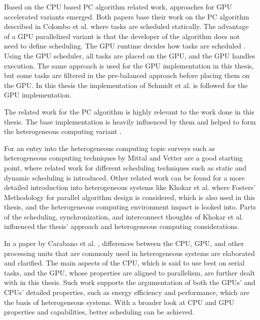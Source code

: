 Based on the CPU based PC algorithm related work, approaches for GPU accelerated variants \cite{schmidtOrderIndependentConstraintBasedCausal2018,zarebavaniCuPCCUDAbasedParallel2018} emerged. Both papers base their work on the PC algorithm described in Colombo et al. \cite{colomboOrderIndependentConstraintBasedCausal2014} where tasks are scheduled statically. The advantage of a GPU parallelized variant is that the developer of the algorithm does not need to define scheduling. The GPU runtime decides how tasks are scheduled \cite{olmedoDissectingCUDAScheduling2020}. Using the GPU scheduler, all tasks are placed on the GPU, and the GPU handles execution. The same approach is used for the GPU implementation in this thesis, but some tasks are filtered in the pre-balanced approach before placing them on the GPU. In this thesis the implementation of Schmidt et al. \cite{schmidtOrderIndependentConstraintBasedCausal2018} is followed for the GPU implementation.

The related work for the PC algorithm is highly relevant to the work done in this thesis. The base implementation is heavily influenced by them and helped to form the heterogeneous computing variant \cite{colomboOrderIndependentConstraintBasedCausal2014,schmidtOrderIndependentConstraintBasedCausal2018,schmidtLoadBalancedParallelConstraintBased2019,leFastPCAlgorithm2019,leParallelPCPackageEfficient2018}.

For an entry into the heterogeneous computing topic surveys such as heterogeneous computing techniques by Mittal and Vetter \cite{mittalSurveyCPUGPUHeterogeneous2015} are a good starting point, where related work for different scheduling techniques such as static and dynamic scheduling is introduced. Other related work can be found for a more detailed introduction into heterogeneous systems like Khokar et al. \cite{khokharHeterogeneousComputingChallenges1993} where Fosters' Methodology \cite{fosterDesigningBuildingParallel1995} for parallel algorithm design is considered, which is also used in this thesis, and the heterogeneous computing environment impact is looked into. Parts of the scheduling, synchronization, and interconnect thoughts of Khokar et al. \cite{khokharHeterogeneousComputingChallenges1993} influenced the thesis' approach and heterogeneous computing considerations.

In a paper by Carabano et al. \cite{carabanoExplorationHeterogeneousSystems2013}, differences between the CPU, GPU, and other processing units that are commonly used in heterogeneous systems are elaborated and clarified. The main aspects of the CPU, which is said to use best on serial tasks, and the GPU, whose properties are aligned to parallelism, are further dealt with in this thesis. Such work supports the argumentation of both the GPUs' and CPUs' detailed properties, such as energy efficiency and performance, which are the basis of heterogeneous systems. With a broader look at CPU and GPU properties and capabilities, better scheduling can be achieved.

